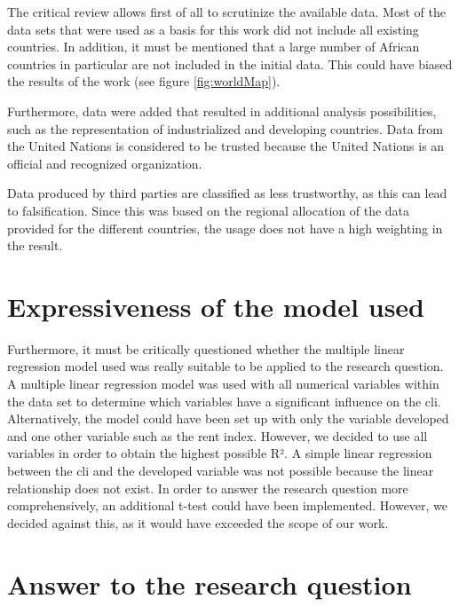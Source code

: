 \documentclass[
  11pt,
  a4paper,
  twoside]{scrbook}
\begin{document}
The critical review allows first of all to scrutinize the available data. Most of the data sets that were used as a basis for this work did not include all existing countries. In addition, it must be mentioned that a large number of African countries in particular are not included in the initial data. This could have biased the results of the work (see figure \ref{fig:worldMap}).

Furthermore, data were added that resulted in additional analysis possibilities, such as the representation of industrialized and developing countries. Data from the United Nations is considered to be trusted because the United Nations is an official and recognized organization.

Data produced by third parties are classified as less trustworthy, as this can lead to falsification. Since this was based on the regional allocation of the data provided for the different countries, the usage does not have a high weighting in the result.

\hypertarget{expressiveness-of-the-model-used}{%
\section{Expressiveness of the model used}\label{expressiveness-of-the-model-used}}

Furthermore, it must be critically questioned whether the multiple linear regression model used was really suitable to be applied to the research question. A multiple linear regression model was used with all numerical variables within the data set to determine which variables have a significant influence on the cli. Alternatively, the model could have been set up with only the variable developed and one other variable such as the rent index. However, we decided to use all variables in order to obtain the highest possible R². A simple linear regression between the cli and the developed variable was not possible because the linear relationship does not exist. In order to answer the research question more comprehensively, an additional t-test could have been implemented. However, we decided against this, as it would have exceeded the scope of our work.

\hypertarget{answer-to-the-research-question}{%
\section{Answer to the research question}\label{answer-to-the-research-question}}
\end{document}
